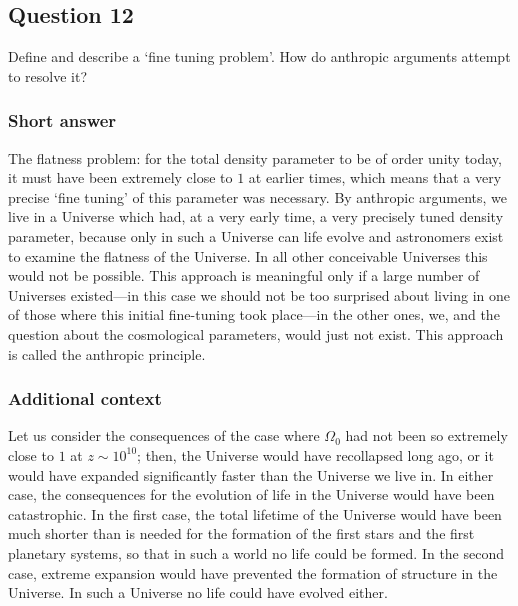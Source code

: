 \documentclass[a4paper,11pt]{article}
\begin{document}
%
%

\newpage
\subsection{Question 12}

Define and describe a `fine tuning problem'. How do anthropic arguments attempt to resolve it?

\subsubsection{Short answer}

The flatness problem: for the total density parameter to be of order unity today, it must have been extremely close to $1$ at earlier times, which means that a very precise `fine tuning' of this parameter was necessary. By anthropic arguments, we live in a Universe which had, at a very early time, a very precisely tuned density parameter, because only in such a Universe can life evolve and astronomers exist to examine the flatness of the Universe. In all other conceivable Universes this would not be possible. This approach is meaningful only if a large number of Universes existed—in this case we should not be too surprised about living in one of those where this initial fine-tuning took place—in the other ones, we, and the question about the cosmological parameters, would just not exist. This approach is called the anthropic principle.

\subsubsection{Additional context}

Let us consider the consequences of the case where $\Omega_0$ had not been so extremely close to $1$ at $z\sim10^{10}$; then, the Universe would have recollapsed long ago, or it would have expanded significantly faster than the Universe we live in. In either case, the consequences for the evolution of life in the Universe would have been catastrophic. In the first case, the total lifetime of the Universe would have been much shorter than is needed for the formation of the first stars and the first planetary systems, so that in such a world no life could be formed. In the second case, extreme expansion would have prevented the formation of structure in the Universe. In such a Universe no life could have evolved either. 
\end{document}
